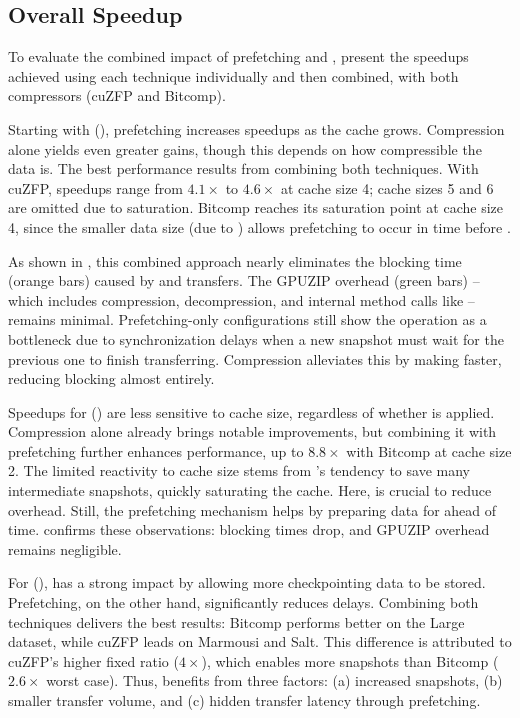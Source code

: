 \documentclass[Ingles,Final]{ic-tese-v3}
\begin{document}
\subsection{Overall Speedup}
\label{sec:comppref_speeudup}
To evaluate the combined impact of prefetching and \compression,  present the speedups achieved using each technique individually and then combined, with both compressors (cuZFP and Bitcomp).

Starting with \revolve (), prefetching increases speedups as the cache grows. Compression alone yields even greater gains, though this depends on how compressible the data is. The best performance results from combining both techniques. With cuZFP, speedups range from $4.1\times$ to $4.6\times$ at cache size 4; cache sizes 5 and 6 are omitted due to saturation. Bitcomp reaches its saturation point at cache size 4, since the smaller data size (due to \compression) allows prefetching to occur in time before \restore.

As shown in , this combined approach nearly eliminates the blocking time (orange bars) caused by \dth and \htd transfers. The GPUZIP overhead (green bars) -- which includes compression, decompression, and internal method calls like \psa -- remains minimal. Prefetching-only configurations still show the \save operation as a bottleneck due to synchronization delays when a new snapshot must wait for the previous one to finish transferring. Compression alleviates this by making \dth faster, reducing \save blocking almost entirely.

Speedups for \zcut () are less sensitive to cache size, regardless of whether \compression is applied. Compression alone already brings notable improvements, but combining it with prefetching further enhances performance, up to $8.8\times$ with Bitcomp at cache size 2. The limited reactivity to cache size stems from \zcut's tendency to save many intermediate snapshots, quickly saturating the cache. Here, \compression is crucial to reduce \save overhead. Still, the prefetching mechanism helps by preparing data for \restore ahead of time.  confirms these observations: blocking times drop, and GPUZIP overhead remains negligible.

For \uniform (), \compression has a strong impact by allowing more checkpointing data to be stored. Prefetching, on the other hand, significantly reduces \htd delays. Combining both techniques delivers the best results: Bitcomp performs better on the Large dataset, while cuZFP leads on Marmousi and Salt. This difference is attributed to cuZFP's higher fixed \compression ratio ($4\times$), which enables more snapshots than Bitcomp ($2.6\times$ worst case). Thus, \uniform benefits from three factors: (a) increased snapshots, (b) smaller transfer volume, and (c) hidden transfer latency through prefetching.
\end{document}
